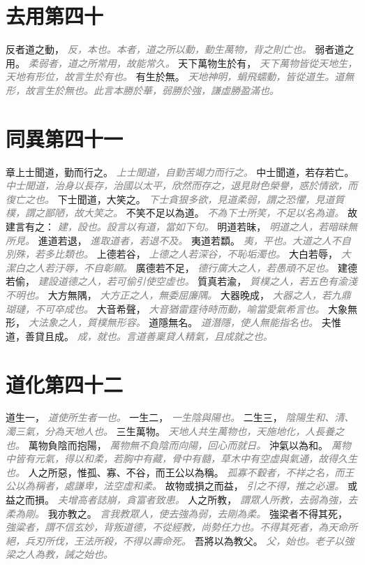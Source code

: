 \documentclass[a4paper,zihao=-4,oneside,landscape,UTF8]{ctexart}
\newcommand{\zhushi}[1]{\scriptsize{\textit{\textcolor{gray}{#1}}}\normalsize}
\begin{document}
\section{去用第四十}

反者道之動，
\zhushi{反，本也。本者，道之所以動，動生萬物，背之則亡也。}
弱者道之用。
\zhushi{柔弱者，道之所常用，故能常久。}
天下萬物生於有，
\zhushi{天下萬物皆從天地生，天地有形位，故言生於有也。}
有生於無。
\zhushi{天地神明，蜎飛蠕動，皆從道生。道無形，故言生於無也。此言本勝於華，弱勝於強，謙虛勝盈滿也。}


\section{同異第四十一}

章上士聞道，勤而行之。
\zhushi{上士聞道，自勤苦竭力而行之。}
中士聞道，若存若亡。
\zhushi{中士聞道，治身以長存，治國以太平，欣然而存之，退見財色榮譽，惑於情欲，而復亡之也。}
下士聞道，大笑之。
\zhushi{下士貪狠多欲，見道柔弱，謂之恐懼，見道質樸，謂之鄙陋，故大笑之。}
不笑不足以為道。
\zhushi{不為下士所笑，不足以名為道。}
故建言有之：
\zhushi{建，設也。設言以有道，當如下句。}
明道若昧，
\zhushi{明道之人，若暗昧無所見。}
進道若退，
\zhushi{進取道者，若退不及。}
夷道若纇。
\zhushi{夷，平也。大道之人不自別殊，若多比類也。}
上德若谷，
\zhushi{上德之人若深谷，不恥垢濁也。}
大白若辱，
\zhushi{大潔白之人若汙辱，不自彰顯。}
廣德若不足，
\zhushi{德行廣大之人，若愚頑不足也。}
建德若偷，
\zhushi{建設道德之人，若可偷引使空虛也。}
質真若渝，
\zhushi{質樸之人，若五色有渝淺不明也。}
大方無隅，
\zhushi{大方正之人，無委屈廉隅。}
大器晚成，
\zhushi{大器之人，若九鼎瑚璉，不可卒成也。}
大音希聲，
\zhushi{大音猶雷霆待時而動，喻當愛氣希言也。}
大象無形，
\zhushi{大法象之人，質樸無形容。}
道隱無名。
\zhushi{道潛隱，使人無能指名也。}
夫惟道，善貸且成。
\zhushi{成，就也。言道善稟貸人精氣，且成就之也。}


\section{道化第四十二}

道生一，
\zhushi{道使所生者一也。}
一生二，
\zhushi{一生陰與陽也。}
二生三，
\zhushi{陰陽生和、清、濁三氣，分為天地人也。}
三生萬物。
\zhushi{天地人共生萬物也，天施地化，人長養之也。}
萬物負陰而抱陽，
\zhushi{萬物無不負陰而向陽，回心而就日。}
沖氣以為和。
\zhushi{萬物中皆有元氣，得以和柔，若胸中有藏，骨中有髓，草木中有空虛與氣通，故得久生也。}
人之所惡，惟孤、寡、不谷，而王公以為稱。
\zhushi{孤寡不轂者，不祥之名，而王公以為稱者，處謙卑，法空虛和柔。}
故物或損之而益，
\zhushi{引之不得，推之必還。}
或益之而損。
\zhushi{夫增高者誌崩，貪富者致患。}
人之所教，
\zhushi{謂眾人所教，去弱為強，去柔為剛。}
我亦教之。
\zhushi{言我教眾人，使去強為弱，去剛為柔。}
強梁者不得其死，
\zhushi{強粱者，謂不信玄妙，背叛道德，不從經教，尚勢任力也。不得其死者，為天命所絕，兵刃所伐，王法所殺，不得以壽命死。}
吾將以為教父。
\zhushi{父，始也。老子以強梁之人為教，誡之始也。}
\end{document}
